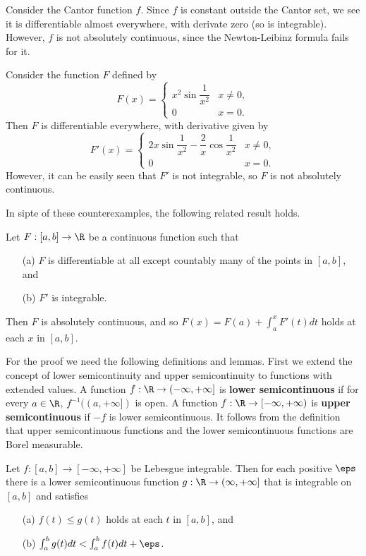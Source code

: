 \begin{example}
Consider the Cantor function $f$. Since $f$ is constant outside the Cantor set, we see it is differentiable almost everywhere, with derivate zero (so is integrable). However, $f$ is not absolutely continuous, since the Newton-Leibinz formula fails for it.
\end{example}
\begin{example}
Consider the function $F$ defined by
\[F(x)=\begin{cases}
x^2\sin\dfrac{1}{x^2}&x\neq 0,\\[8pt]
0&x=0.
\end{cases}\]
Then $F$ is differentiable everywhere, with derivative given by
\[F'(x)=\begin{cases}
2x\sin\dfrac{1}{x^2}-\dfrac{2}{x}\cos\dfrac{1}{x^2}&x\neq 0,\\[8pt]
0&x=0.
\end{cases}\]
However, it can be easily seen that $F'$ is not integrable, so $F$ is not absolutely continuous.
\end{example}
In sipte of these counterexamples, the following related result holds.
\begin{theorem}\label{absolutely continuous if}
Let $F:[a,b]\to\R$ be a continuous function such that
\begin{itemize}
\item[(a)] $F$ is differentiable at all except countably many of the points in $[a,b]$, and
\item[(b)] $F'$ is integrable.
\end{itemize}
Then $F$ is absolutely continuous, and so $F(x)=F(a)+\int_a^xF'(t)dt$ holds at each $x$ in $[a,b]$.
\end{theorem}
For the proof we need the following definitions and lemmas. First we extend the concept of lower semicontinuity and upper semicontinuity to functions with extended values. A function $f:\R\to(-\infty,+\infty]$ is \textbf{lower semicontinuous} if for every $a\in\R$, $f^{-1}((a,+\infty])$ is open. A function $f:\R\to[-\infty,+\infty)$ is \textbf{upper semicontinuous} if $-f$ is lower semicontinuous. It follows from the definition that upper semicontinuous functions and the lower semicontinuous functions are Borel measurable.
\begin{lemma}\label{lower semicontinuous upper bound}
Let $f:[a,b]\to[-\infty,+\infty]$ be Lebesgue integrable. Then for each positive $\eps$ there is a lower semicontinuous function $g:\R\to(\infty,+\infty]$ that is integrable on $[a,b]$ and satisfies
\begin{itemize}
\item[(a)] $f(t)\leq g(t)$ holds at each $t$ in $[a,b]$, and
\item[(b)] $\int_a^bg(t)dt<\int_a^bf(t)dt+\eps$.
\end{itemize}
\end{lemma}
